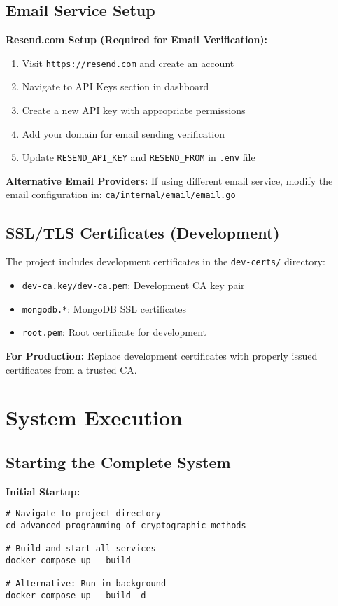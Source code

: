 \subsection{Email Service Setup}

\textbf{Resend.com Setup (Required for Email Verification):}
\begin{enumerate}
    \item Visit \texttt{https://resend.com} and create an account
    \item Navigate to API Keys section in dashboard
    \item Create a new API key with appropriate permissions
    \item Add your domain for email sending verification
    \item Update \texttt{RESEND\_API\_KEY} and \texttt{RESEND\_FROM} in \texttt{.env} file
\end{enumerate}

\textbf{Alternative Email Providers:}
If using different email service, modify the email configuration in:
\texttt{ca/internal/email/email.go}

\subsection{SSL/TLS Certificates (Development)}

The project includes development certificates in the \texttt{dev-certs/} directory:
\begin{itemize}
    \item \texttt{dev-ca.key/dev-ca.pem}: Development CA key pair
    \item \texttt{mongodb.*}: MongoDB SSL certificates
    \item \texttt{root.pem}: Root certificate for development
\end{itemize}

\textbf{For Production:} Replace development certificates with properly issued certificates from a trusted CA.

\section{System Execution}

\subsection{Starting the Complete System}

\textbf{Initial Startup:}
\begin{verbatim}
# Navigate to project directory
cd advanced-programming-of-cryptographic-methods

# Build and start all services
docker compose up --build

# Alternative: Run in background
docker compose up --build -d
\end{verbatim}

